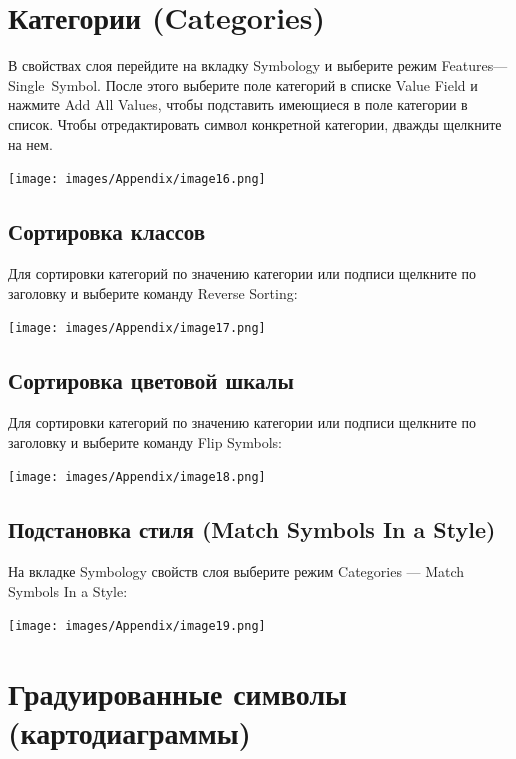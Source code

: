 \documentclass[12pt,]{book}
\begin{document}
\hypertarget{manual-vector-categories}{%
\section{Категории (Categories)}\label{manual-vector-categories}}

В свойствах слоя перейдите на вкладку Symbology и выберите режим Features---Single~Symbol. После этого выберите поле категорий в списке Value Field и нажмите Add All Values, чтобы подставить имеющиеся в поле категории в список. Чтобы отредактировать символ конкретной категории, дважды щелкните на нем.

\texttt{[image: images/Appendix/image16.png]}

\hypertarget{manual-vector-sorting}{%
\subsection{Сортировка классов}\label{manual-vector-sorting}}

Для сортировки категорий по значению категории или подписи щелкните по заголовку и выберите команду Reverse Sorting:

\texttt{[image: images/Appendix/image17.png]}

\hypertarget{manual-vector-colorscale}{%
\subsection{Сортировка цветовой шкалы}\label{manual-vector-colorscale}}

Для сортировки категорий по значению категории или подписи щелкните по заголовку и выберите команду Flip Symbols:

\texttt{[image: images/Appendix/image18.png]}

\hypertarget{manual-vector-match}{%
\subsection{Подстановка стиля (Match Symbols In a Style)}\label{manual-vector-match}}

На вкладке Symbology свойств слоя выберите режим Categories --- Match Symbols In a Style:

\texttt{[image: images/Appendix/image19.png]}

\hypertarget{manual-vector-diagrams}{%
\section{Градуированные символы (картодиаграммы)}\label{manual-vector-diagrams}}
\end{document}
